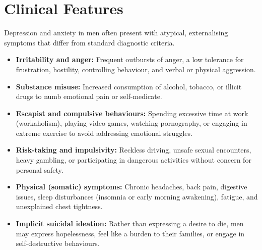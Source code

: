 \section*{Clinical Features}
Depression and anxiety in men often present with atypical, externalising symptoms that differ from standard diagnostic criteria.
\begin{itemize}
    \item \textbf{Irritability and anger:} Frequent outbursts of anger, a low tolerance for frustration, hostility, controlling behaviour, and verbal or physical aggression.
    \item \textbf{Substance misuse:} Increased consumption of alcohol, tobacco, or illicit drugs to numb emotional pain or self-medicate.
    \item \textbf{Escapist and compulsive behaviours:} Spending excessive time at work (workaholism), playing video games, watching pornography, or engaging in extreme exercise to avoid addressing emotional struggles.
    \item \textbf{Risk-taking and impulsivity:} Reckless driving, unsafe sexual encounters, heavy gambling, or participating in dangerous activities without concern for personal safety.
    \item \textbf{Physical (somatic) symptoms:} Chronic headaches, back pain, digestive issues, sleep disturbances (insomnia or early morning awakening), fatigue, and unexplained chest tightness.
    \item \textbf{Implicit suicidal ideation:} Rather than expressing a desire to die, men may express hopelessness, feel like a burden to their families, or engage in self-destructive behaviours.
\end{itemize}

